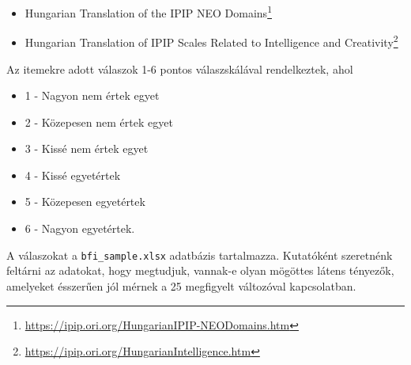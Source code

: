\documentclass[
  letterpaper,
]{krantz}
\providecommand{\tightlist}{%
  \setlength{\itemsep}{0pt}\setlength{\parskip}{0pt}}\usepackage{longtable,booktabs,array}
\renewcommand{\href}[2]{#2\footnote{\url{#1}}}
\begin{document}
\begin{itemize}
\tightlist
\item
  \href{https://ipip.ori.org/HungarianIPIP-NEODomains.htm}{Hungarian
  Translation of the IPIP NEO Domains}
\item
  \href{https://ipip.ori.org/HungarianIntelligence.htm}{Hungarian
  Translation of IPIP Scales Related to Intelligence and Creativity}
\end{itemize}

Az itemekre adott válaszok 1-6 pontos válaszskálával rendelkeztek, ahol

\begin{itemize}
\tightlist
\item
  1 - Nagyon nem értek egyet
\item
  2 - Közepesen nem értek egyet
\item
  3 - Kissé nem értek egyet
\item
  4 - Kissé egyetértek
\item
  5 - Közepesen egyetértek
\item
  6 - Nagyon egyetértek.
\end{itemize}

A válaszokat a \texttt{bfi\_sample.xlsx} adatbázis tartalmazza.
Kutatóként szeretnénk feltárni az adatokat, hogy megtudjuk, vannak-e
olyan mögöttes látens tényezők, amelyeket ésszerűen jól mérnek a 25
megfigyelt változóval kapcsolatban.
\end{document}
